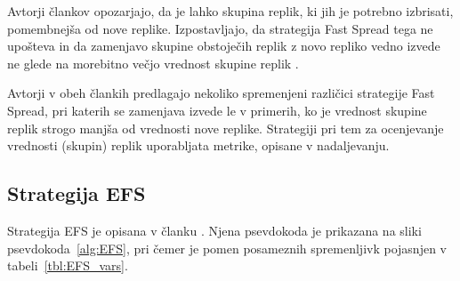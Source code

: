 \documentclass[a4paper, 12pt]{book}
\begin{document}
Avtorji člankov opozarjajo, da je lahko skupina replik, ki jih je potrebno
izbrisati, pomembnejša od nove replike. Izpostavljajo,
da strategija Fast Spread tega ne upošteva in da zamenjavo skupine obstoječih
replik z novo repliko vedno izvede ne glede na morebitno večjo vrednost skupine
replik \cite{efs2011, mfs2012}.

Avtorji v obeh člankih predlagajo nekoliko spremenjeni različici strategije
Fast Spread, pri katerih se zamenjava izvede le v primerih, ko je vrednost
skupine replik strogo manjša od vrednosti nove replike. Strategiji pri tem
za ocenjevanje vrednosti (skupin) replik uporabljata metrike, opisane v
nadaljevanju.

\subsection{Strategija EFS}

Strategija EFS je opisana v članku \cite{efs2011}. Njena psevdokoda
je prikazana na sliki psevdokoda~\ref{alg:EFS}, pri čemer
je pomen posameznih spremenljivk pojasnjen v tabeli~\ref{tbl:EFS_vars}.
\end{document}
